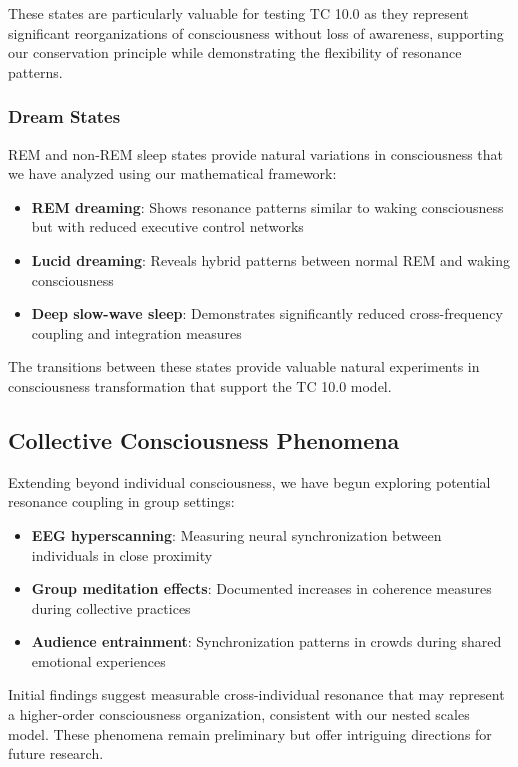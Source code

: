 \documentclass[12pt]{article}
\begin{document}
These states are particularly valuable for testing TC 10.0 as they represent significant reorganizations of consciousness without loss of awareness, supporting our conservation principle while demonstrating the flexibility of resonance patterns.

\subsubsection{Dream States}

REM and non-REM sleep states provide natural variations in consciousness that we have analyzed using our mathematical framework:

\begin{itemize}
    \item \textbf{REM dreaming}: Shows resonance patterns similar to waking consciousness but with reduced executive control networks
    \item \textbf{Lucid dreaming}: Reveals hybrid patterns between normal REM and waking consciousness
    \item \textbf{Deep slow-wave sleep}: Demonstrates significantly reduced cross-frequency coupling and integration measures
\end{itemize}

The transitions between these states provide valuable natural experiments in consciousness transformation that support the TC 10.0 model.

\subsection{Collective Consciousness Phenomena}

Extending beyond individual consciousness, we have begun exploring potential resonance coupling in group settings:

\begin{itemize}
    \item \textbf{EEG hyperscanning}: Measuring neural synchronization between individuals in close proximity
    \item \textbf{Group meditation effects}: Documented increases in coherence measures during collective practices
    \item \textbf{Audience entrainment}: Synchronization patterns in crowds during shared emotional experiences
\end{itemize}

Initial findings suggest measurable cross-individual resonance that may represent a higher-order consciousness organization, consistent with our nested scales model. These phenomena remain preliminary but offer intriguing directions for future research.
\end{document}
